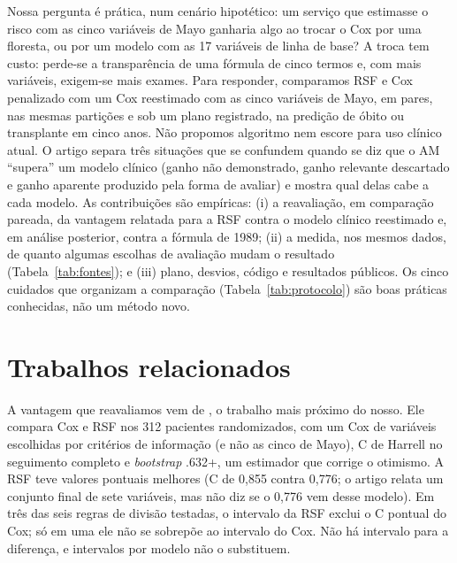 \documentclass[12pt]{article}
\begin{document}
Nossa pergunta é prática, num cenário hipotético: um serviço que estimasse o risco com as cinco variáveis de Mayo ganharia algo ao trocar o Cox por uma floresta, ou por um modelo com as 17 variáveis de linha de base? A troca tem custo: perde-se a transparência de uma fórmula de cinco termos e, com mais variáveis, exigem-se mais exames. Para responder, comparamos RSF e Cox penalizado com um Cox reestimado com as cinco variáveis de Mayo, em pares, nas mesmas partições e sob um plano registrado, na predição de óbito ou transplante em cinco anos. Não propomos algoritmo nem escore para uso clínico atual. O artigo separa três situações que se confundem quando se diz que o AM ``supera'' um modelo clínico (ganho não demonstrado, ganho relevante descartado e ganho aparente produzido pela forma de avaliar) e mostra qual delas cabe a cada modelo. As contribuições são empíricas: (i) a reavaliação, em comparação pareada, da vantagem relatada para a RSF \cite{graf2026coxrsf} contra o modelo clínico reestimado e, em análise posterior, contra a fórmula de 1989; (ii) a medida, nos mesmos dados, de quanto algumas escolhas de avaliação mudam o resultado (Tabela~\ref{tab:fontes}); e (iii) plano, desvios, código e resultados públicos. Os cinco cuidados que organizam a comparação (Tabela~\ref{tab:protocolo}) são boas práticas conhecidas, não um método novo.

\section{Trabalhos relacionados}\label{sec:relacionados}

A vantagem que reavaliamos vem de \cite{graf2026coxrsf}, o trabalho mais próximo do nosso. Ele compara Cox e RSF nos 312 pacientes randomizados, com um Cox de variáveis escolhidas por critérios de informação (e não as cinco de Mayo), C de Harrell no seguimento completo e \textit{bootstrap} .632+, um estimador que corrige o otimismo. A RSF teve valores pontuais melhores (C de 0,855 contra 0,776; o artigo relata um conjunto final de sete variáveis, mas não diz se o 0,776 vem desse modelo). Em três das seis regras de divisão testadas, o intervalo da RSF exclui o C pontual do Cox; só em uma ele não se sobrepõe ao intervalo do Cox. Não há intervalo para a diferença, e intervalos por modelo não o substituem.
\end{document}
